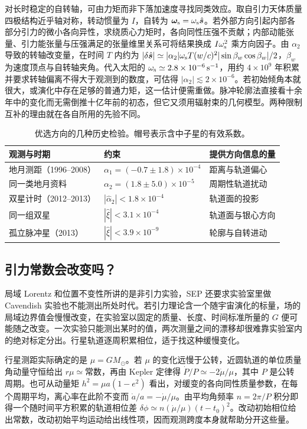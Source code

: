 对长时稳定的自转轴，可由力矩而非下落加速度寻找同类效应。取自引力天体质量四极结构近乎轴对称，转动惯量为 $I$，自转为 $\bm\omega_{\rm s}=\omega_{\rm s}\hat{\bm s}$。若外部方向引起内部各部分引力的微小各向异性，求绕质心力矩时，各向同性压强不贡献；内部动能张量、引力能张量与压强满足的张量维里关系可将结果换成 $I\omega_{\rm s}^2$ 乘方向因子。由 $\alpha_2$ 导致的转轴改变量，在时间 $T$ 内约为 $|\delta\hat{\bm s}|\simeq |\alpha_2|\omega_{\rm s}T(w/c)^2|\sin\beta_w\cos\beta_w|/2$，$\beta_w$ 为速度顶点与自转轴夹角。代入太阳的 $\omega_{\rm s}\simeq2.8\times10^{-6}\,\mathrm{s}^{-1}$，用约 $4\times10^9$ 年积累并要求转轴偏离不得大于观测到的数度，可估得 $|\alpha_2|\lesssim2\times10^{-6}$。若初始倾角本就很大，或演化中存在足够的普通力矩，这一估计便需重做。脉冲轮廓法直接看十余年中的变化而无需倒推十亿年前的初态，但它又须用辐射束的几何模型。两种限制互补的理由就在各自所用的先验不同。

\begin{table}[htbp]\centering\small
\caption{优选方向的几种历史检验。帽号表示含中子星的有效系数。}
\begin{tabular}{@{}lll@{}}\hline
观测与时期 & 约束 & 提供方向信息的量\\ \hline
地月测距（1996--2008） & $\alpha_1=(-0.7\pm1.8)\times10^{-4}$ & 距离与轨道偏心\\
同一类地月资料 & $\alpha_2=(1.8\pm5.0)\times10^{-5}$ & 周期性轨道扰动\\
双星计时（2012--2013） & $|\hat\alpha_2|<1.8\times10^{-4}$ & 轨道面的投影\\
同一组双星 & $|\hat\xi|<3.1\times10^{-4}$ & 轨道面与银心方向\\
孤立脉冲星（2013） & $|\hat\xi|<3.9\times10^{-9}$ & 轮廓与自转进动\\ \hline
\end{tabular}
\end{table}

\subsection{引力常数会改变吗？}

局域 Lorentz 和位置不变性所讲的是非引力实验，SEP 还要求实验室里做 Cavendish 实验也不能测出所处时代。若引力理论含一个随宇宙演化的标量，场的局域边界值会慢慢改变，在实验室以固定的质量、长度、时间标准所量的 $G$ 便可能随之改变。一次实验只能测出某时的值，两次测量之间的漂移却很难靠实验室内的绝对标定分出。行星轨道逐周积累相位，适于找这种缓慢变化。

行星测距实际确定的是 $\mu=GM_\odot$。若 $\mu$ 的变化远慢于公转，近圆轨道的单位质量角动量守恒给出 $r\mu\simeq\text{常数}$，再由 Kepler 定律得 $\dot P/P\simeq-2\dot\mu/\mu$，其中 $P$ 是公转周期。也可从动量矩 $h^2=\mu a(1-e^2)$ 看出，对缓变的各向同性质量参数，在每个周期平均，离心率在此阶不变而 $\dot a/a=-\dot\mu/\mu$。由平均角频率 $n=2\pi/P$ 积分即得一个随时间平方积累的轨道相位差 $\delta\phi\simeq n(\dot\mu/\mu)(t-t_0)^2$。改动初始相位给出常数，改动初始平均运动给出线性项，因而观测跨度本身就帮助分开这些量。

